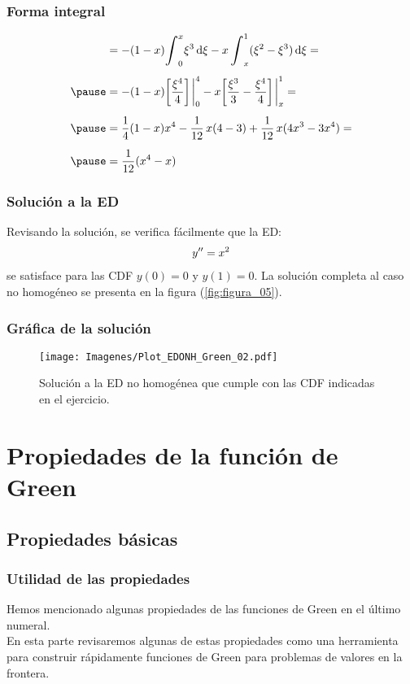 \documentclass[12pt]{beamer}
\begin{document}
\begin{frame}
\frametitle{Forma integral}
\begin{eqnarray}
\begin{aligned}[b]
&= - (1 - x) \scaleint{6ex}_{0}^{x} \xi^{3} \dd{\xi} - x \, \scaleint{6ex}_{x}^{1} (\xi^{2} - \xi^{3}) \dd{\xi} = \\[0.5em] \pause
&= - (1 - x) \bigg[ \dfrac{\xi^{4}}{4} \bigg] \eval_{0}^{4} - x \bigg[ \dfrac{\xi^{3}}{3} - \dfrac{\xi^{4}}{4} \bigg] \eval_{x}^{1} = \\[0.5em] \pause
&= \dfrac{1}{4} (1 - x) x^{4} - \dfrac{1}{12} \, x (4 - 3) + \dfrac{1}{12} \, x (4 x^{3} - 3 x^{4}) = \\[0.5em] \pause
&= \dfrac{1}{12} (x^{4} - x)
\end{aligned}
\label{eq:ecuacion_07_36}
\end{eqnarray}
\end{frame}

\begin{frame}
\frametitle{Solución a la ED}
Revisando la solución, se verifica fácilmente que la ED:
\pause
\begin{align*}
{y}^{\prime \prime} = x^{2}
\end{align*}
se satisface para las CDF $y (0) = 0$ y $y (1) = 0$. \pause La solución completa al caso no homogéneo se presenta en la figura (\ref{fig:figura_05}).
\end{frame}

\begin{frame}
\frametitle{Gráfica de la solución}
\begin{figure}[H]
    \centering
    \texttt{[image: Imagenes/Plot\_EDONH\_Green\_02.pdf]}
    \caption{Solución a la ED no homogénea que cumple con las CDF indicadas en el ejercicio.}
    \label{fig:figura_06}
\end{figure}
\end{frame}

\section{Propiedades de la función de Green}
\subsection{Propiedades básicas}

\begin{frame}
\frametitle{Utilidad de las propiedades}
Hemos mencionado algunas propiedades de las funciones de Green en el último numeral.
\\
\bigskip
\pause
En esta parte revisaremos algunas de estas propiedades como una herramienta para construir rápidamente funciones de Green para problemas de valores en la frontera.
\end{frame}
\end{document}
